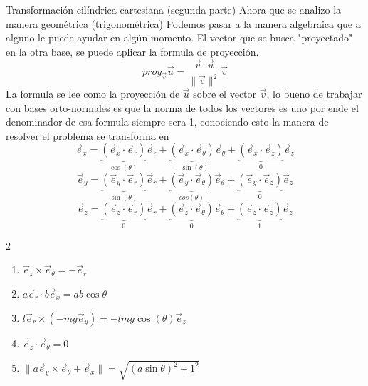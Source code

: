 \begin{solucion}{Transformación cilíndrica-cartesiana (segunda parte)}
Ahora que se analizo la manera geométrica (trigonométrica) Podemos pasar a la manera algebraica que a alguno le puede ayudar en algún momento. El vector que se busca "proyectado" en la otra base, se puede aplicar la formula de proyección.
$$proy_{\vec{v}}\vec{u}=\dfrac{\vec{v}\cdot\vec{u}}{\|\vec{v}\|^2}\vec{v}$$
La formula se lee como la proyección de $\vec{u}$ sobre el vector $\vec{v}$, lo bueno de trabajar con bases orto-normales es que la norma de todos los vectores es uno por ende el denominador de esa formula siempre sera 1, conociendo esto la manera de resolver el problema se transforma en 
$$\vec{e}_x=\underbrace{(\vec{e}_x\cdot\vec{e}_r)}_{\cos(\theta)}\vec{e}_r+\underbrace{(\vec{e}_x\cdot\vec{e}_{\theta})}_{-\sin(\theta)}\vec{e}_{\theta}+\underbrace{(\vec{e}_x\cdot\vec{e}_z)}_{0}\vec{e}_z$$
$$\vec{e}_y=\underbrace{(\vec{e}_y\cdot\vec{e}_r)}_{\sin(\theta)}\vec{e}_r+\underbrace{(\vec{e}_y\cdot\vec{e}_{\theta})}_{cos(\theta)}\vec{e}_{\theta}+\underbrace{(\vec{e}_y\cdot\vec{e}_z)}_{0}\vec{e}_z$$
$$\vec{e}_z=\underbrace{(\vec{e}_z\cdot\vec{e}_r)}_{0}\vec{e}_r+\underbrace{(\vec{e}_z\cdot\vec{e}_{\theta})}_{0}\vec{e}_{\theta}+\underbrace{(\vec{e}_z\cdot\vec{e}_z)}_{1}\vec{e}_z$$


\begin{multicols}{2}
\begin{enumerate}[label=\alph*), start=4]
    \item $\Vec{e}_z\times\Vec{e}_\theta=-\vec{e}_r$
    \item $a\Vec{e}_r\cdot b\Vec{e}_x=ab\cos\theta$
    \item $l\Vec{e}_r\times(-mg\Vec{e}_y)=-lmg\cos(\theta)\vec{e}_z$
    \item $\Vec{e}_z\cdot\Vec{e}_\theta=0$
    \item $\|a\Vec{e}_y\times\Vec{e}_\theta+\Vec{e}_x\|=\sqrt{(a\sin \theta)^2+1^2}$
    
\end{enumerate}
\end{multicols}
\end{solucion}
